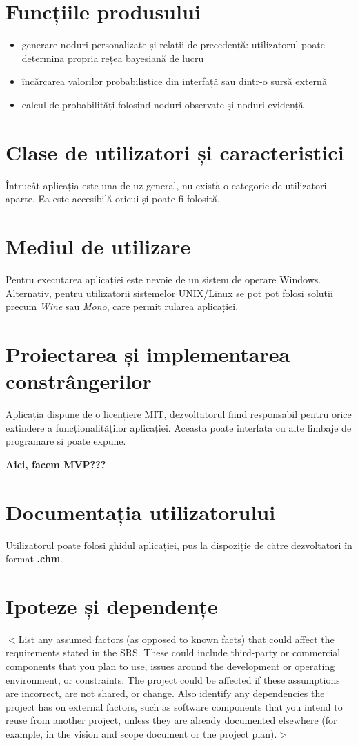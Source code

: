 \documentclass{scrreprt}
\begin{document}
\section{Funcțiile produsului}
\begin{itemize}
	\item generare noduri personalizate și relații de precedență: utilizatorul poate determina propria rețea bayesiană de lucru
	\item încărcarea valorilor probabilistice din interfață sau dintr-o sursă externă
	\item calcul de probabilități folosind noduri observate și noduri evidență
\end{itemize}

\section{Clase de utilizatori și caracteristici}
Întrucât aplicația este una de uz general, nu există o categorie de utilizatori aparte. Ea este accesibilă oricui și poate fi folosită.

\section{Mediul de utilizare}
Pentru executarea aplicației este nevoie de un sistem de operare Windows. Alternativ, pentru utilizatorii sistemelor UNIX/Linux se pot pot folosi soluții precum \textit{Wine} sau \textit{Mono}, care permit rularea aplicației.

\section{Proiectarea și implementarea constrângerilor}
Aplicația dispune de o licențiere MIT, dezvoltatorul fiind responsabil pentru orice extindere a funcționalităților aplicației. Aceasta poate interfața cu alte limbaje de programare și poate expune.\par
\textbf{Aici, facem MVP???}

\section{Documentația utilizatorului}
Utilizatorul poate folosi ghidul aplicației, pus la dispoziție de către dezvoltatori în format \textbf{.chm}.

\section{Ipoteze și dependențe}
$<$List any assumed factors (as opposed to known facts) that could affect the 
requirements stated in the SRS. These could include third-party or commercial 
components that you plan to use, issues around the development or operating 
environment, or constraints. The project could be affected if these assumptions 
are incorrect, are not shared, or change. Also identify any dependencies the 
project has on external factors, such as software components that you intend to 
reuse from another project, unless they are already documented elsewhere (for 
example, in the vision and scope document or the project plan).$>$
\end{document}
